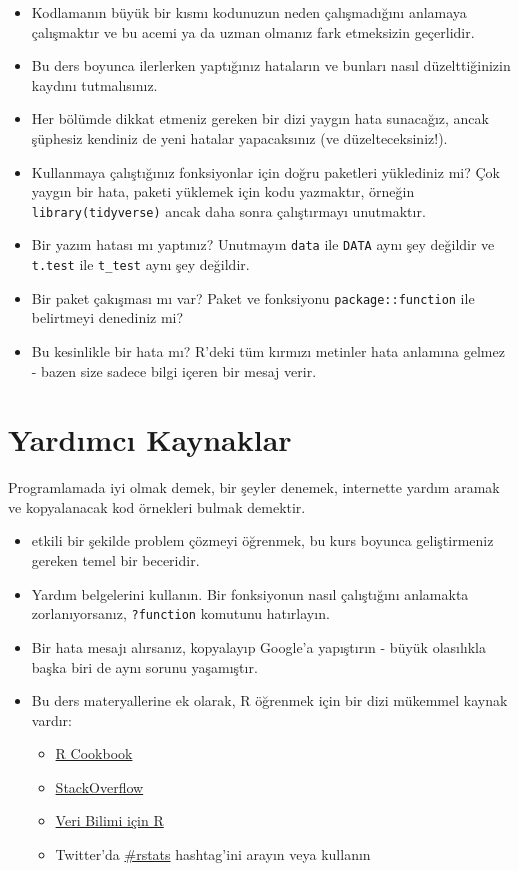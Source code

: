 \documentclass[
  oneside]{book}
\providecommand{\tightlist}{%
  \setlength{\itemsep}{0pt}\setlength{\parskip}{0pt}}
\begin{document}
\begin{itemize}
\item
  Kodlamanın büyük bir kısmı kodunuzun neden çalışmadığını anlamaya çalışmaktır ve bu acemi ya da uzman olmanız fark etmeksizin geçerlidir.
\item
  Bu ders boyunca ilerlerken yaptığınız hataların ve bunları nasıl düzelttiğinizin kaydını tutmalısınız.
\item
  Her bölümde dikkat etmeniz gereken bir dizi yaygın hata sunacağız, ancak şüphesiz kendiniz de yeni hatalar yapacaksınız (ve düzelteceksiniz!).
\item
  Kullanmaya çalıştığınız fonksiyonlar için doğru paketleri yüklediniz mi? Çok yaygın bir hata, paketi yüklemek için kodu yazmaktır, örneğin \texttt{library(tidyverse)} ancak daha sonra çalıştırmayı unutmaktır.
\item
  Bir yazım hatası mı yaptınız? Unutmayın \texttt{data} ile \texttt{DATA} aynı şey değildir ve \texttt{t.test} ile \texttt{t\_test} aynı şey değildir.
\item
  Bir paket çakışması mı var? Paket ve fonksiyonu \texttt{package::function} ile belirtmeyi denediniz mi?
\item
  Bu kesinlikle bir hata mı? R'deki tüm kırmızı metinler hata anlamına gelmez - bazen size sadece bilgi içeren bir mesaj verir.
\end{itemize}

\hypertarget{yardux131mcux131-kaynaklar}{%
\section{Yardımcı Kaynaklar}\label{yardux131mcux131-kaynaklar}}

Programlamada iyi olmak demek, bir şeyler denemek, internette yardım aramak ve kopyalanacak kod örnekleri bulmak demektir.

\begin{itemize}
\item
  etkili bir şekilde problem çözmeyi öğrenmek, bu kurs boyunca geliştirmeniz gereken temel bir beceridir.
\item
  Yardım belgelerini kullanın. Bir fonksiyonun nasıl çalıştığını anlamakta zorlanıyorsanız, \texttt{?function} komutunu hatırlayın.
\item
  Bir hata mesajı alırsanız, kopyalayıp Google'a yapıştırın - büyük olasılıkla başka biri de aynı sorunu yaşamıştır.
\item
  Bu ders materyallerine ek olarak, R öğrenmek için bir dizi mükemmel kaynak vardır:

  \begin{itemize}
  \tightlist
  \item
    \href{http://www.cookbook-r.com/}{R Cookbook}
  \item
    \href{https://stackoverflow.com/}{StackOverflow}
  \item
    \href{https://r4ds.had.co.nz/}{Veri Bilimi için R}
  \item
    Twitter'da \href{https://twitter.com/search?f=tweets\&q=\%23rstats\&src=typd}{\#rstats} hashtag'ini arayın veya kullanın
  \end{itemize}
\end{itemize}
\end{document}
